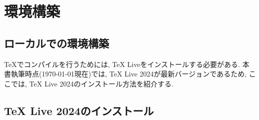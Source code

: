 \section{環境構築}
\subsection{ローカルでの環境構築}
\TeX でコンパイルを行うためには, TeX Liveをインストールする必要がある. 
本書執筆時点(\today 現在)では, TeX Live 2024が最新バージョンであるため, 
ここでは, TeX Live 2024のインストール方法を紹介する. 
\subsection{TeX Live 2024のインストール}
